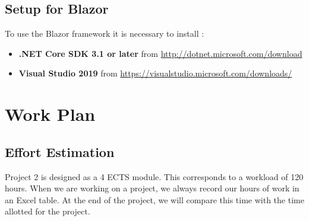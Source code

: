 \documentclass{scrartcl}
\begin{document}









\subsection{Setup for Blazor}
To use the Blazor framework it is necessary to install :\\
\begin{itemize}
\item \textbf{.NET Core SDK 3.1 or later} from \url {http://dotnet.microsoft.com/download}
\item \textbf{Visual Studio 2019} from \url {https://visualstudio.microsoft.com/downloads/}
\end{itemize}








\section{Work Plan}
  		\subsection{Effort Estimation}
  		
  		Project 2  is designed as a 4 ECTS module. This corresponds to a workload of 120 hours. When we are working on a project, we always record our hours of work in an Excel table.
 At the end of the project, we will compare this time with the time allotted for the project. 		
  		
\end{document}
